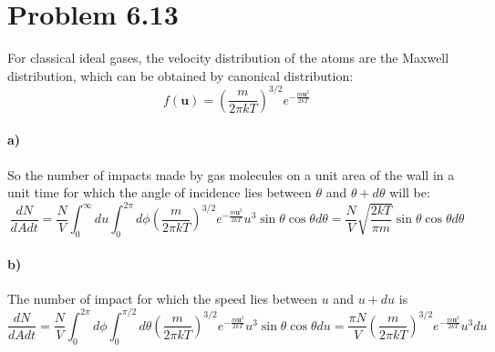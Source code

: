 \documentclass{article}
\begin{document}
\section*{Problem 6.13}
For classical ideal gases, the velocity distribution of the atoms are the Maxwell distribution, which can be obtained by canonical distribution:
\begin{equation}
f(\mathbf{u}) = \left(\frac{m}{2\pi kT}\right)^{3/2}e^{-\frac{m\mathbf{u}^2}{2kT}}
\end{equation}
\paragraph{a)}
So the number of impacts made by gas molecules on a unit area of the wall in a unit time for which the angle of incidence lies between $\theta$ and $\theta + d\theta$ will be:
\begin{equation}
\frac{dN}{dAdt} = \frac{N}{V}\int_0^\infty du\int_0^{2\pi} d\phi \left(\frac{m}{2\pi kT}\right)^{3/2}e^{-\frac{m\mathbf{u}^2}{2kT}}u^3\sin{\theta} \cos{\theta}d\theta=\frac{N}{V}\sqrt{\frac{2kT}{\pi m}}\sin\theta\cos\theta d\theta
\end{equation}
\paragraph{b)}The number of impact for which the speed lies between $u$ and $u + du$ is
\begin{equation}
\frac{dN}{dAdt} = \frac{N}{V}\int_0^{2\pi}d\phi \int_0^{\pi/2}d\theta \left(\frac{m}{2\pi kT}\right)^{3/2}e^{-\frac{m\mathbf{u}^2}{2kT}}u^3\sin{\theta} \cos{\theta}du=\frac{\pi N}{V} \left(\frac{m}{2\pi kT}\right)^{3/2}e^{-\frac{m\mathbf{u}^2}{2kT}}u^3 du
\end{equation}
\end{document}
